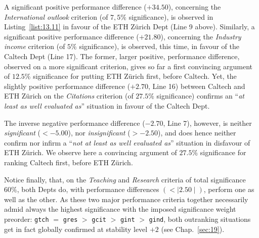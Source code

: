 A significant positive performance difference ($+34.50$), concerning the \emph{International outlook} criterion (of $7,5\%$ significance), is observed in Listing~\vref{list:13.11} in favour of the ETH Zürich Dept (Line 9 above). Similarly, a significant positive performance difference ($+21.80$), concerning the \emph{Industry income} criterion (of $5\%$ significance), is observed, this time, in favour of the Caltech Dept (Line 17). The former, larger positive, performance difference, observed on a more significant criterion, gives so far a first convincing argument of $12.5\%$ significance for putting ETH Zürich first, before Caltech. Yet, the slightly positive performance difference ($+2.70$, Line 16) between Caltech and ETH Zürich on the \emph{Citations} criterion (of $27.5\%$ significance) confirms an ``\emph{at least as well evaluated as}'' situation in favour of the Caltech Dept.

The inverse negative performance difference ($-2.70$, Line 7), however, is neither \emph{significant} ($< -5.00$), nor \emph{insignificant} ($> -2.50$), and does hence neither confirm nor infirm a ``\emph{not at least as well evaluated as}'' situation in disfavour of ETH Zürich. We observe here a convincing argument of $27.5\%$ significance for ranking Caltech first, before ETH Zürich.

Notice finally, that, on the \emph{Teaching} and \emph{Research} criteria of total significance $60\%$, both Depts do, with performance differences $(< \mid 2.50 \mid)$, perform one as well as the other. As these two major performance criteria together necessarily admid always the highest significance with the imposed significance weight preorder: \texttt{gtch} $=$ \texttt{gres} $>$ \texttt{gcit} $>$ \texttt{gint} $>$ \texttt{gind}, both outranking situations get in fact globally confirmed at stability level $+2$ (see Chap.~\ref{sec:19}).

